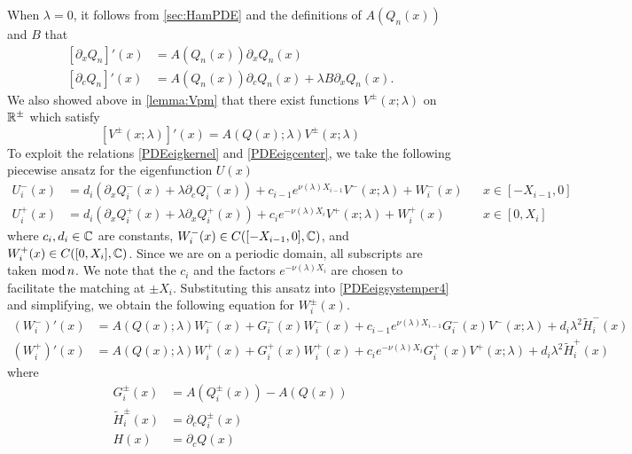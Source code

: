 \documentclass[thesis.tex]{subfiles}
\begin{document}
When $\lambda = 0$, it follows from \cref{sec:HamPDE} and the definitions of $A(Q_n(x))$ and $B$ that 
\begin{equation}\label{PDEeigkernel}
\begin{aligned}
{[\partial_x Q_n]}'(x) &= A(Q_n(x))\partial_x Q_n(x) \\
{[\partial_c Q_n]}'(x) &= A(Q_n(x))\partial_c Q_n(x) + \lambda B \partial_x Q_n(x).
\end{aligned}
\end{equation}
We also showed above in \cref{lemma:Vpm} that there exist functions $V^\pm(x; \lambda)$ on $\mathbb{R}^\pm$ which satisfy
\begin{equation}\label{PDEeigcenter}
[V^\pm(x; \lambda)]'(x) = A(Q(x); \lambda) V^\pm(x; \lambda)
\end{equation}
To exploit the relations \eqref{PDEeigkernel} and \eqref{PDEeigcenter}, we take the following piecewise ansatz for the eigenfunction $U(x)$
\begin{equation}\label{Vpiecewise}
\begin{aligned}
U_i^-(x) &= d_i (\partial_x Q_i^-(x) + \lambda \partial_c Q_i^-(x)) + c_{i-1} e^{\nu(\lambda)X_{i-1} } V^-(x; \lambda) + W_i^-(x) && x \in [-X_{i-1}, 0] \\
U_i^+(x) &= d_i (\partial_x Q_i^+(x) + \lambda \partial_x Q_i^+(x)) + c_i e^{-\nu(\lambda)X_i }V^+(x; \lambda) + W_i^+(x) && x \in [0, X_i] 
\end{aligned}
\end{equation}
where $c_i, d_i \in \mathbb{C}$ are constants, $W_i^-(x) \in C([-X_{i-1}, 0], \mathbb{C})$, and $W_i^+(x) \in C([0, X_i], \mathbb{C})$. Since we are on a periodic domain, all subscripts are taken $\mathop\mathrm{mod}\nolimits n$. We note that the $c_i$ and the factors $e^{-\nu(\lambda)X_i }$ are chosen to facilitate the matching at $\pm X_i$. Substituting this ansatz into \cref{PDEeigsystemper4} and simplifying, we obtain the following equation for $W_i^\pm(x)$.
\begin{equation}\label{Wipm2}
\begin{aligned}
(W_i^-)'(x) &= A(Q(x); \lambda) W_i^-(x) + G_i^-(x) W_i^-(x) + c_{i-1} e^{\nu(\lambda)X_{i-1}} G_i^-(x)V^-(x; \lambda) + d_i \lambda^2 \tilde{H}_i^-(x) \\
(W_i^+)'(x) &= A(Q(x); \lambda) W_i^+(x) + G_i^+(x) W_i^+(x) + c_i e^{-\nu(\lambda)X_i } G_i^+(x)V^+(x; \lambda) + d_i \lambda^2 \tilde{H}_i^+(x)
\end{aligned}
\end{equation}
where
\begin{align*}
G_i^\pm(x) &= A(Q_i^\pm(x)) - A(Q(x)) \\
\tilde{H}_i^\pm(x) &= \partial_c Q_i^\pm(x) \\ 
H(x) &= \partial_c Q(x)
\end{align*}
\end{document}
